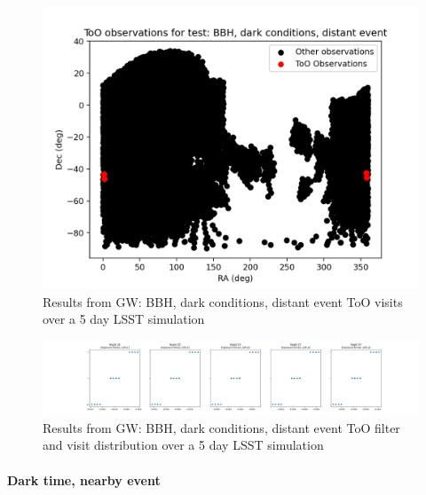 \begin{figure}
    \centering
    \includegraphics[width=\linewidth]{figures/validationTests/SVRequired/BBHDarkFarPosition.png}
    \caption{Results from GW: BBH, dark conditions, distant event ToO visits over a 5 day LSST simulation}
    \label{fig:GWBBHDarkFarPositionResult}
\end{figure}

\begin{figure}
    \centering
    \includegraphics[width=\linewidth]{figures/validationTests/SVRequired/BBHDarkFarFilterPlot.png}
    \caption{Results from GW: BBH, dark conditions, distant event ToO filter and visit distribution over a 5 day LSST simulation}
    \label{fig:GWBBHDarkFarFilterResult}
\end{figure}
\newpage
\paragraph{Dark time, nearby event}

